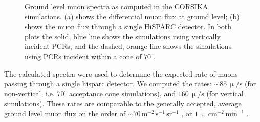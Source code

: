 \begin{figure}[ht!]
	\centering
	\qquad
	\caption{Ground level muon spectra as computed in the CORSIKA simulations. (a) shows the differential muon flux at ground level; (b) shows the muon flux through a single HiSPARC detector. In both plots the solid, blue line shows the simulations using vertically incident PCRs, and the dashed, orange line shows the simulations using PCRs incident within a cone of $70^{\circ}$.}
	\label{fig:CORSIKA_muon_spectra}
\end{figure}



The calculated spectra were used to determine the expected rate of muons passing through a single \gls{hisparc} detector. We computed the rates: $\sim 85 \, \upmu/\mathrm{s}$ (for non-vertical, i.e. $70^\circ$ acceptance cone simulations), and $160 \, \upmu/\mathrm{s}$ (for vertical simulations). These rates are comparable to the generally accepted, average ground level muon flux on the order of $\sim 70 \, \mathrm{m}^{-2}\,\mathrm{s}^{-1}\,\mathrm{sr}^{-1}$ \citep{cecchini_cosmic_2000, blackmore_terrestrial_2015, pereira_ground_2020, particle_data_group_review_2020}, or $1\,\upmu\,\mathrm{cm}^{-2}\,\mathrm{min}^{-1}$ \citep{particle_data_group_review_2020}. %

